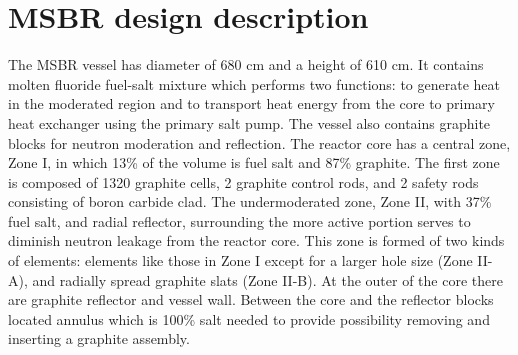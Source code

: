 \documentclass{anstrans}
\begin{document}
\section{MSBR design description}
The MSBR vessel has diameter of 680 cm and a height of 610 cm. It contains molten fluoride fuel-salt mixture which performs two functions: to generate heat in the moderated region and to transport heat energy from the core to primary heat exchanger using the primary salt pump. The vessel also contains graphite blocks for neutron moderation and reflection. The reactor core has a central zone, Zone I, in which 13\% of the volume is fuel salt and 87\% graphite. The first zone is composed of 1320 graphite cells, 2 graphite control rods, and 2 safety rods consisting of boron carbide clad. The undermoderated zone, Zone II, with 37\% fuel salt, and radial reflector, surrounding the more active portion serves to diminish neutron leakage from the reactor core. This zone is formed of two kinds of elements: elements like those in Zone I except for a larger hole size (Zone II-A), and radially spread graphite slats (Zone II-B). At the outer of the core there are graphite reflector and vessel wall. Between the core and the reflector blocks located annulus which is 100\% salt needed to provide possibility removing and inserting a graphite assembly. 
\end{document}

